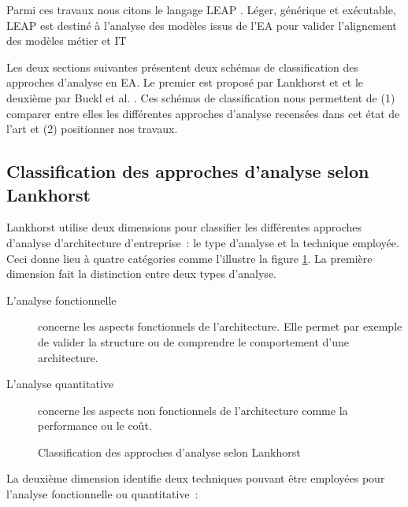Parmi ces travaux nous citons le langage LEAP \cite{clark2011leap}. Léger, 
générique et exécutable, LEAP est destiné à l'analyse des modèles issus de l'EA 
pour valider l'alignement des modèles métier et IT 

Les deux sections suivantes présentent deux schémas de classification des
approches d'analyse en EA. Le premier est proposé par Lankhorst
\cite{lankhorst2013enterprise} et et le deuxième par Buckl et al. \cite{buckl2009classifying}. Ces schémas de classification nous permettent de (1) comparer entre elles les différentes approches d'analyse recensées dans cet état de l'art et (2) positionner nos travaux.


\subsection{Classification des approches d'analyse selon Lankhorst}

Lankhorst \cite{lankhorst2013enterprise} utilise deux dimensions pour classifier les différentes approches d'analyse d'architecture d'entreprise~: le type d'analyse et la technique employée. Ceci donne lieu à quatre catégories comme l'illustre la
figure \ref{fig:classLankhorst}. La première dimension fait la distinction
entre deux types d'analyse.

\begin{description}
    \item[L'analyse fonctionnelle] concerne les aspects fonctionnels de
    l'architecture. Elle permet par exemple de valider la structure ou de
    comprendre le comportement d'une architecture.

    \item[L'analyse quantitative] concerne les aspects non fonctionnels de
    l'architecture comme la performance ou le coût.
\end{description}

\begin{figure}[!ht]
    \begin{center}
        
    \end{center}
    \caption{Classification des approches d'analyse selon Lankhorst 
    \protect\cite{lankhorst2013enterprise}}
    \label{fig:classLankhorst}
\end{figure}

La deuxième dimension identifie deux techniques pouvant être employées pour 
l'analyse fonctionnelle ou quantitative~:

